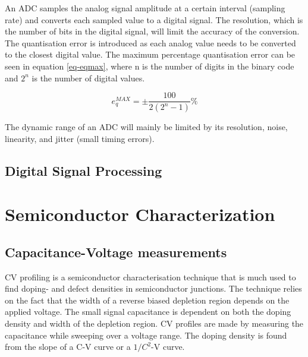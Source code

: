 \documentclass[../main/thesis.tex]{subfiles}
\begin{document}

An \gls{ADC} samples the analog signal amplitude at a certain interval (sampling rate) and converts each sampled value to a digital signal. The resolution, which is the number of bits in the digital signal, will limit the accuracy of the conversion. The quantisation error is introduced as each analog value needs to be converted to the closest digital value. The maximum percentage quantisation error can be seen in equation \ref{eq-eqmax}, where n is the number of digits in the binary code and $2^n$ is the number of digital values. \citep[chap. 10]{Bentley}

\begin{equation}%
	e_q^{MAX} = \pm \frac{100}{2(2^n - 1)}\%
	\label{eq-eqmax}
\end{equation}

The dynamic range of an \gls{ADC} will mainly be limited by its resolution, noise, linearity, and jitter (small timing errors). %

\subsection{Digital Signal Processing}
\label{t-dsp}


\section{Semiconductor Characterization}
\label{t-char}

\subsection{Capacitance-Voltage measurements}
\label{t-cv}
\gls{CV} profiling is a semiconductor characterisation technique that is much used to find doping- and defect densities in semiconductor junctions. The technique relies on the fact that the width of a reverse biased depletion region depends on the applied voltage. The small signal capacitance is dependent on both the doping density and width of the depletion region. \gls{CV} profiles are made by measuring the capacitance while sweeping over a voltage range. The doping density is found from the slope of a C-V curve or a $1/C^2$-V curve. \citep[chap. 2]{Schroder}
\end{document}
